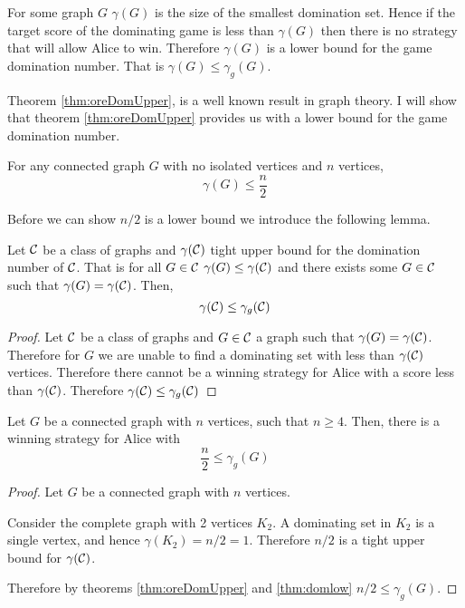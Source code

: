 For some graph $G$ $\gamma(G)$ is the size of the smallest domination set. Hence if the target score of the dominating game is less than $\gamma(G)$ then there is no strategy that will allow Alice to win. Therefore $\gamma(G)$ is a lower bound for the game domination number. That is $\gamma(G)\leq\gamma_g(G)$. 

Theorem \ref{thm:oreDomUpper}, is a well known result in graph theory. I will show that theorem \ref{thm:oreDomUpper} provides us with a lower bound for the game domination number.  
  
\begin{theorem} \label{thm:oreDomUpper} 
    For any connected graph $G$ with no isolated vertices and $n$ vertices,     
    \[\gamma(G) \leq \frac{n}{2}\]
\end{theorem}

Before we can show $n/2$ is a lower bound we introduce the following lemma. 
\begin{lemma}[Askes]\label{thm:domlow}
    Let $\mathcal{C}$ be a class of graphs and $\gamma(\mathcal{C})$ tight upper bound for the domination number of $\mathcal{C}$. That is for all $G\in\mathcal{C}$ $\gamma(G)\leq\gamma(\mathcal{C})$ and there exists some $G\in\mathcal{C}$ such that $\gamma(G)=\gamma(\mathcal{C})$. Then,
    \[\gamma(\mathcal{C}) \leq  \gamma_g(\mathcal{C})\]
\end{lemma}
\begin{proof}
    Let $\mathcal{C}$ be a class of graphs and $G\in\mathcal{C}$ a graph such that $\gamma(G) = \gamma(\mathcal{C})$. 
    Therefore for $G$ we are unable to find a dominating set with less than $ \gamma(\mathcal{C}) $ vertices.
    Therefore there cannot be a winning strategy for Alice with a score less than $\gamma(\mathcal{C})$.
    Therefore $\gamma(\mathcal{C}) \leq \gamma_g(\mathcal{C})$
\end{proof}

\begin{theorem}[Askes] \label{thm:gamedomLow}
    Let $G$ be a connected graph with $n$ vertices, such that $n \geq 4$. Then, there is a winning strategy for Alice with    
    \[  \frac{n}{2} \leq \gamma_g(G)  \]    
\end{theorem} %
\begin{proof}
    Let $G$ be a connected graph with $n$ vertices.
    
    Consider the complete graph with 2 vertices $K_2$. A dominating set in $K_2$ is a single vertex, and hence $\gamma(K_2)=n/2=1$. Therefore $n/2$ is a tight upper bound for $\gamma(\mathcal{C})$. 
    
    Therefore by theorems \ref{thm:oreDomUpper} and \ref{thm:domlow} $ n/2 \leq \gamma_g(G)$.
\end{proof}

